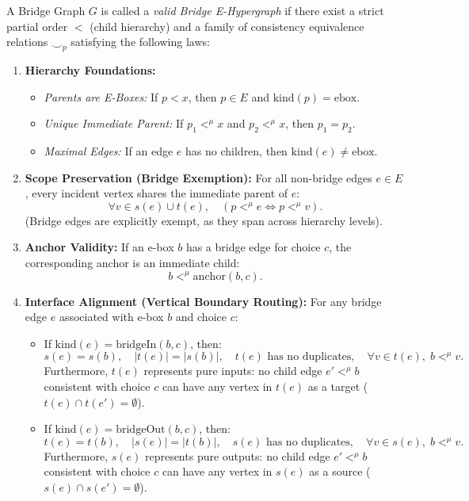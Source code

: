 \documentclass[11pt,a4paper]{article}
\theoremstyle{definition}
\theoremstyle{plain}
\begin{document}
A Bridge Graph $G$ is called a \emph{valid Bridge E-Hypergraph} if there exist a strict partial order $<$ (child hierarchy) and a family of consistency equivalence relations $\smile_p$ satisfying the following laws:

\begin{enumerate}[label=\textbf{L\arabic*.}]
    \item \textbf{Hierarchy Foundations:}
    \begin{itemize}
        \item \emph{Parents are E-Boxes:} If $p < x$, then $p \in E$ and $\mathrm{kind}(p) = \mathrm{ebox}$.
        \item \emph{Unique Immediate Parent:} If $p_1 <^\mu x$ and $p_2 <^\mu x$, then $p_1 = p_2$.
        \item \emph{Maximal Edges:} If an edge $e$ has no children, then $\mathrm{kind}(e) \neq \mathrm{ebox}$.
    \end{itemize}

    \item \textbf{Scope Preservation (Bridge Exemption):}
    For all non-bridge edges $e \in E$, every incident vertex shares the immediate parent of $e$:
    \[
    \forall v \in s(e) \cup t(e), \quad (p <^\mu e \iff p <^\mu v).
    \]
    (Bridge edges are explicitly exempt, as they span across hierarchy levels).

    \item \textbf{Anchor Validity:}
    If an e-box $b$ has a bridge edge for choice $c$, the corresponding anchor is an immediate child:
    \[
    b <^\mu \mathrm{anchor}(b, c).
    \]

    \item \textbf{Interface Alignment (Vertical Boundary Routing):}
    For any bridge edge $e$ associated with e-box $b$ and choice $c$:
    \begin{itemize}
        \item If $\mathrm{kind}(e) = \mathrm{bridgeIn}(b, c)$, then:
        \[
        s(e) = s(b), \quad |t(e)| = |s(b)|, \quad t(e) \text{ has no duplicates}, \quad \forall v \in t(e), \; b <^\mu v.
        \]
        Furthermore, $t(e)$ represents pure inputs: no child edge $e' <^\mu b$ consistent with choice $c$ can have any vertex in $t(e)$ as a target ($t(e) \cap t(e') = \emptyset$).
        
        \item If $\mathrm{kind}(e) = \mathrm{bridgeOut}(b, c)$, then:
        \[
        t(e) = t(b), \quad |s(e)| = |t(b)|, \quad s(e) \text{ has no duplicates}, \quad \forall v \in s(e), \; b <^\mu v.
        \]
        Furthermore, $s(e)$ represents pure outputs: no child edge $e' <^\mu b$ consistent with choice $c$ can have any vertex in $s(e)$ as a source ($s(e) \cap s(e') = \emptyset$).
    \end{itemize}


\end{enumerate}
\end{document}
